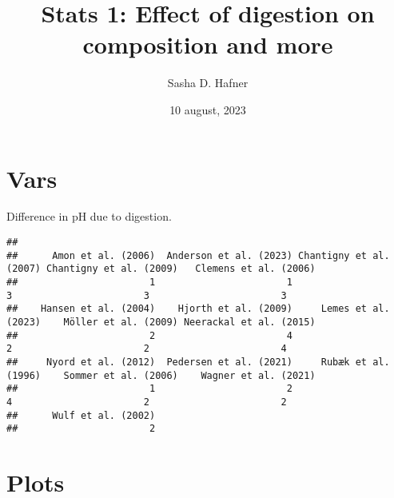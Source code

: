 \documentclass[
]{article}
\title{Stats 1: Effect of digestion on composition and more}
\author{Sasha D. Hafner}
\date{10 august, 2023}
\newenvironment{Shaded}{\begin{snugshade}}{\end{snugshade}}
\newcommand{\FunctionTok}[1]{\textcolor[rgb]{0.13,0.29,0.53}{\textbf{#1}}}
\newcommand{\NormalTok}[1]{#1}
\newcommand{\OtherTok}[1]{\textcolor[rgb]{0.56,0.35,0.01}{#1}}
\newcommand{\SpecialCharTok}[1]{\textcolor[rgb]{0.81,0.36,0.00}{\textbf{#1}}}
\begin{document}
\maketitle

\hypertarget{vars}{%
\section{Vars}\label{vars}}

Difference in pH due to digestion.

\begin{Shaded}
\end{Shaded}

\begin{Shaded}
\end{Shaded}

\begin{verbatim}
## 
##      Amon et al. (2006)  Anderson et al. (2023) Chantigny et al. (2007) Chantigny et al. (2009)   Clemens et al. (2006) 
##                       1                       1                       3                       3                       3 
##    Hansen et al. (2004)    Hjorth et al. (2009)     Lemes et al. (2023)    Möller et al. (2009) Neerackal et al. (2015) 
##                       2                       4                       2                       2                       4 
##     Nyord et al. (2012)  Pedersen et al. (2021)     Rubæk et al. (1996)    Sommer et al. (2006)    Wagner et al. (2021) 
##                       1                       2                       4                       2                       2 
##      Wulf et al. (2002) 
##                       2
\end{verbatim}

\hypertarget{plots}{%
\section{Plots}\label{plots}}
\end{document}
